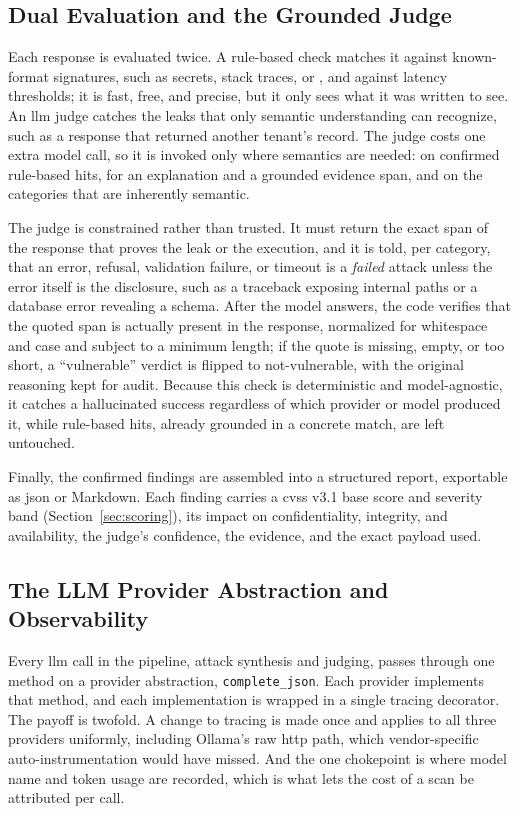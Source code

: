 \subsection{Dual Evaluation and the Grounded Judge}
\label{sec:evaluator}

Each response is evaluated twice. A rule-based check matches it against known-format signatures, such as secrets, stack traces, or , and against latency thresholds; it is fast, free, and precise, but it only sees what it was written to see. An \gls{llm} judge catches the leaks that only semantic understanding can recognize, such as a response that returned another tenant's record. The judge costs one extra model call, so it is invoked only where semantics are needed: on confirmed rule-based hits, for an explanation and a grounded evidence span, and on the categories that are inherently semantic.

The judge is constrained rather than trusted. It must return the exact span of the response that proves the leak or the execution, and it is told, per category, that an error, refusal, validation failure, or timeout is a \emph{failed} attack unless the error itself is the disclosure, such as a traceback exposing internal paths or a database error revealing a schema. After the model answers, the code verifies that the quoted span is actually present in the response, normalized for whitespace and case and subject to a minimum length; if the quote is missing, empty, or too short, a ``vulnerable'' verdict is flipped to not-vulnerable, with the original reasoning kept for audit. Because this check is deterministic and model-agnostic, it catches a hallucinated success regardless of which provider or model produced it, while rule-based hits, already grounded in a concrete match, are left untouched.

Finally, the confirmed findings are assembled into a structured report, exportable as \acrshort{json} or Markdown. Each finding carries a \gls{cvss} v3.1 base score and severity band (Section~\ref{sec:scoring}), its impact on confidentiality, integrity, and availability, the judge's confidence, the evidence, and the exact payload used.

\subsection{The LLM Provider Abstraction and Observability}
\label{sec:llm-provider}

Every \gls{llm} call in the pipeline, attack synthesis and judging, passes through one method on a provider abstraction, \texttt{complete\_json}. Each provider implements that method, and each implementation is wrapped in a single tracing decorator. The payoff is twofold. A change to tracing is made once and applies to all three providers uniformly, including Ollama's raw \acrshort{http} path, which vendor-specific auto-instrumentation would have missed. And the one chokepoint is where model name and token usage are recorded, which is what lets the cost of a scan be attributed per call.

